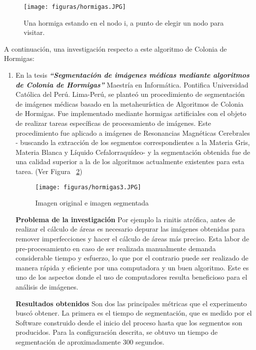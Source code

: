 \documentclass[10pt,conference]{IEEEtran}
\begin{document}
\begin{figure}[H]
 \begin{center}
       \texttt{[image: figuras/hormigas.JPG]}
      \caption{Una hormiga estando en el nodo i, a punto de elegir un nodo para visitar.}
      \label{f5hormiga} 
      \end{center}
\end{figure}

\par A continuación, una investigación respecto a este algoritmo de Colonia de Hormigas:
\begin{enumerate}
\item En la tesis \textbf{\textit{“Segmentación de imágenes médicas mediante algoritmos de Colonia de Hormigas”}} Maestría en Informática. Pontifica Universidad Católica del Perú. Lima-Perú, \citep{calderon} se planteó  un procedimiento de segmentación de imágenes médicas basado en la metaheurística de Algoritmos de Colonia de Hormigas. Fue implementado mediante hormigas artificiales con el objeto de realizar tareas específicas de procesamiento de imágenes. Este procedimiento fue aplicado a imágenes de Resonancias Magnéticas Cerebrales - buscando la extracción de los segmentos correspondientes a la Materia Gris, Materia Blanca y Líquido Cefalorraquídeo- y la segmentación obtenida fue de una calidad superior a la de los algoritmos actualmente existentes para esta tarea. (Ver Figura ~\ref{f3hormiga})
\begin{figure}[H]
 \begin{center}
       \texttt{[image: figuras/hormigas3.JPG]}
      \caption{Imagen original e imagen segmentada}
      \label{f3hormiga} 
      \end{center}
\end{figure}
\textbf{Problema de la investigación}
    Por ejemplo la rinitis atrófica, antes de realizar el cálculo de áreas es necesario depurar las imágenes obtenidas para remover imperfecciones y hacer el cálculo de áreas más preciso. Esta labor de pre-procesamiento en caso de ser realizada manualmente demanda considerable tiempo y esfuerzo, lo que por el contrario puede ser realizado de manera rápida y eficiente por una computadora y un buen algoritmo. Este es uno de los aspectos donde el uso de computadores resulta beneficioso para el análisis de imágenes.\par 
 \textbf{Resultados obtenidos}
    Son dos las principales métricas que el experimento buscó obtener. La primera es el tiempo de segmentación, que es medido por el Software construido desde el inicio del proceso hasta que los segmentos son producidos. Para la configuración descrita, se obtuvo un tiempo de segmentación de aproximadamente 300 segundos.\par    

\end{enumerate}
\end{document}
